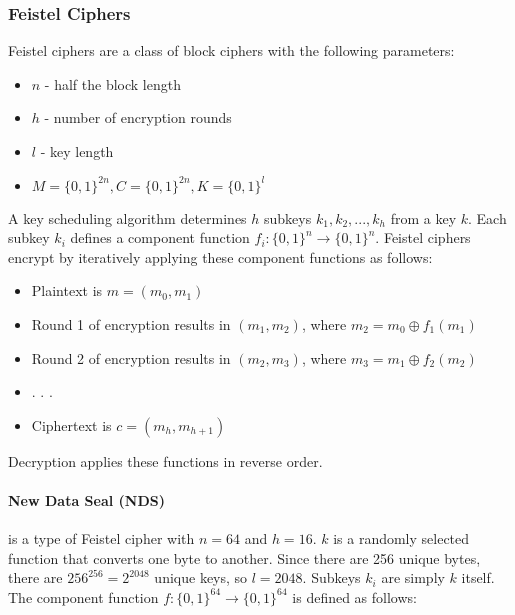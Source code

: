 \documentclass[12pt,titlepage]{article}
\begin{document}
      \subsubsection{Feistel Ciphers}
        Feistel ciphers are a class of block ciphers with the following parameters:
        \begin{itemize}
          \item $n$ - half the block length
          \item $h$ - number of encryption rounds
          \item $l$ - key length
          \item $M = \{0, 1\}^{2n}, C = \{0, 1\}^{2n}, K = \{0, 1\}^{l}$
        \end{itemize}

        A key scheduling algorithm determines $h$ subkeys $k_1, k_2, ..., k_h$ from a key $k$. Each subkey $k_i$ defines a component function
        $f_i : \{0, 1\}^n \rightarrow \{0, 1\}^n$. Feistel ciphers encrypt by iteratively applying these component functions as follows:
        \begin{itemize}
          \item Plaintext is $m = (m_0, m_1)$
          \item Round 1 of encryption results in $(m_1, m_2)$, where $m_2 = m_0 \oplus f_1(m_1)$
          \item Round 2 of encryption results in $(m_2, m_3)$, where $m_3 = m_1 \oplus f_2(m_2)$
          \item . . .
          \item Ciphertext is $c = (m_h, m_{h+1})$
        \end{itemize}

        Decryption applies these functions in reverse order.

        \paragraph{New Data Seal (NDS)} is a type of Feistel cipher with $n = 64$ and $h = 16$. $k$ is a randomly selected function that converts one byte to
        another. Since there are 256 unique bytes, there are $256^{256} = 2^{2048}$ unique keys, so $l = 2048$. Subkeys $k_i$ are simply $k$ itself. The component
        function $f : \{0, 1\}^{64} \rightarrow \{0, 1\}^{64}$ is defined as follows:
\end{document}
